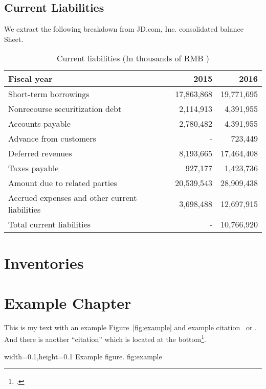 \subsection{Current Liabilities}

We extract the following breakdown from JD.com, Inc. consolidated balance Sheet.\\
 
\begin{table}[H]	
	\begin{center}
		\begin{tabular}{lrr}
			\toprule
			\textbf{Fiscal year}&\textbf{2015}&\textbf{2016}\\
			\midrule
			Short-term borrowings&17,863,868&19,771,695\\
			Nonrecourse securitization debt&2,114,913&4,391,955\\
			Accounts payable&2,780,482&4,391,955\\
			Advance from customers&-&723,449\\
			Deferred revenues&8,193,665&17,464,408\\
			Taxes payable&927,177&1,423,736\\
			Amount due to related parties&20,539,543&28,909,438\\
			Accrued expenses and other current liabilities&3,698,488&12,697,915\\
			Total current liabilities&-&10,766,920\\
			\bottomrule
		\end{tabular}
	\end{center}
	\caption{Current liabilities (In thousands of RMB \textyen)}\label{table:1}
\end{table}

	

\section{Inventories}

\section{Example Chapter}

This is my text with an example Figure~\ref{fig:example} and example
citation~\cite{StrunkWhite} or \textcite{Bringhurst1993}. And there is another
\enquote{citation} which is located at the bottom\footcite{tagstore}.

  {width=0.1\textwidth,height=0.1\textheight}%
  {Example figure.}%
  {}%
  {fig:example}%

